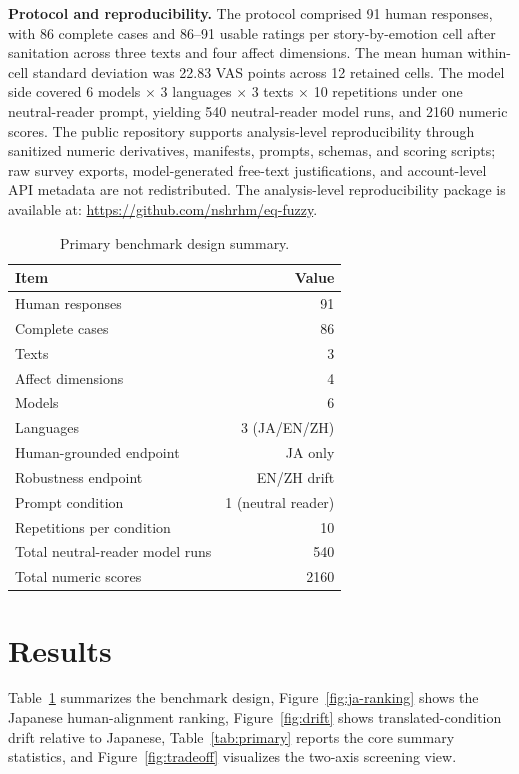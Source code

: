 \documentclass[conference,a4paper]{IEEEtran}
\begin{document}
\textbf{Protocol and reproducibility.} The protocol comprised 91 human responses, with 86 complete cases and 86--91 usable ratings per story-by-emotion cell after sanitation across three texts and four affect dimensions. The mean human within-cell standard deviation was 22.83 VAS points across 12 retained cells. The model side covered 6 models $\times$ 3 languages $\times$ 3 texts $\times$ 10 repetitions under one neutral-reader prompt, yielding 540 neutral-reader model runs, and 2160 numeric scores. The public repository supports analysis-level reproducibility through sanitized numeric derivatives, manifests, prompts, schemas, and scoring scripts; raw survey exports, model-generated free-text justifications, and account-level API metadata are not redistributed. The analysis-level reproducibility package is available at: \url{https://github.com/nshrhm/eq-fuzzy}.

\begin{table}[t]
\caption{Primary benchmark design summary.}
\label{tab:design}
\centering
\begin{tabular}{lr}
\toprule
Item & Value \\
\midrule
Human responses & 91 \\
Complete cases & 86 \\
Texts & 3 \\
Affect dimensions & 4 \\
Models & 6 \\
Languages & 3 (JA/EN/ZH) \\
Human-grounded endpoint & JA only \\
Robustness endpoint & EN/ZH drift \\
Prompt condition & 1 (neutral reader) \\
Repetitions per condition & 10 \\
Total neutral-reader model runs & 540 \\
Total numeric scores & 2160 \\
\bottomrule
\end{tabular}
\end{table}

\section{Results}
Table~\ref{tab:design} summarizes the benchmark design, Figure~\ref{fig:ja-ranking} shows the Japanese human-alignment ranking, Figure~\ref{fig:drift} shows translated-condition drift relative to Japanese, Table~\ref{tab:primary} reports the core summary statistics, and Figure~\ref{fig:tradeoff} visualizes the two-axis screening view.
\end{document}

